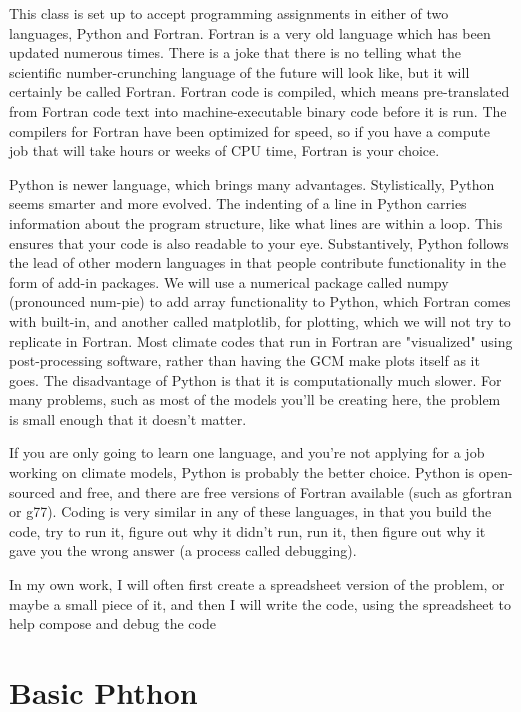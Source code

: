 This class is set up to accept programming assignments in either of two languages, Python and Fortran. Fortran is a very old language which has been updated numerous times. There is a joke that there is no telling what the scientific number-crunching language of the future will look like, but it will certainly be called Fortran. Fortran code is compiled, which means pre-translated from Fortran code text into machine-executable binary code before it is run. The compilers for Fortran have been optimized for speed, so if you have a compute job that will take hours or weeks of CPU time, Fortran is your choice.

Python is newer language, which brings many advantages. Stylistically, Python seems smarter and more evolved. The indenting of a line in Python carries information about the program structure, like what lines are within a loop. This ensures that your code is also readable to your eye. Substantively, Python follows the lead of other modern languages in that people contribute functionality in the form of add-in packages. We will use a numerical package called numpy (pronounced num-pie) to add array functionality to Python, which Fortran comes with built-in, and another called matplotlib, for plotting, which we will not try to replicate in Fortran. Most climate codes that run in Fortran are "visualized" using post-processing software, rather than having the GCM make plots itself as it goes. The disadvantage of Python is that it is computationally much slower. For many problems, such as most of the models you'll be creating here, the problem is small enough that it doesn't matter.

If you are only going to learn one language, and you're not applying for a job working on climate models, Python is probably the better choice. Python is open-sourced and free, and there are free versions of Fortran available (such as gfortran or g77). Coding is very similar in any of these languages, in that you build the code, try to run it, figure out why it didn’t run, run it, then figure out why it gave you the wrong answer (a process called debugging).

In my own work, I will often first create a spreadsheet version of the problem, or maybe a small piece of it, and then I will write the code, using the spreadsheet to help compose and debug the code


\section{Basic Phthon}


